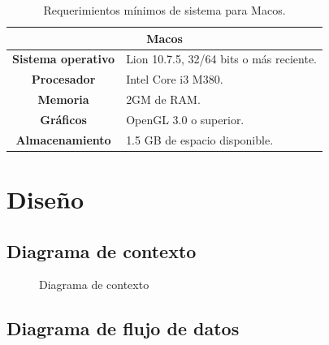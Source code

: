 \documentclass[12pt,twoside]{article}
\begin{document}
	\begin{table}[H]
		\centering
		\begin{tabular}{|c|l|}
			\hline
			\multicolumn{2}{|c|}{\textbf{Macos}} \\ \hline
			\textbf{Sistema operativo} & Lion 10.7.5, 32/64 bits o más reciente. \\ \hline
			\textbf{Procesador} &  Intel Core i3 M380. \\ \hline
			\textbf{Memoria} &  2GM de RAM. \\ \hline
			\textbf{Gráficos} &  OpenGL 3.0 o superior. \\ \hline
			\textbf{Almacenamiento} &   1.5 GB de espacio disponible. \\ \hline
		\end{tabular}
		\caption{Requerimientos mínimos de sistema para Macos.}
		\label{table: requerimientos_mac}
	\end{table} 

	\clearpage
	\section{Diseño}
	
	\subsection{Diagrama de contexto}
	
	\begin{figure}[H]
		\centering
		\caption{Diagrama de contexto}
		\label{diagrama: contexto}
	\end{figure}
	
	\subsection{Diagrama de flujo de datos}
	
\end{document}
